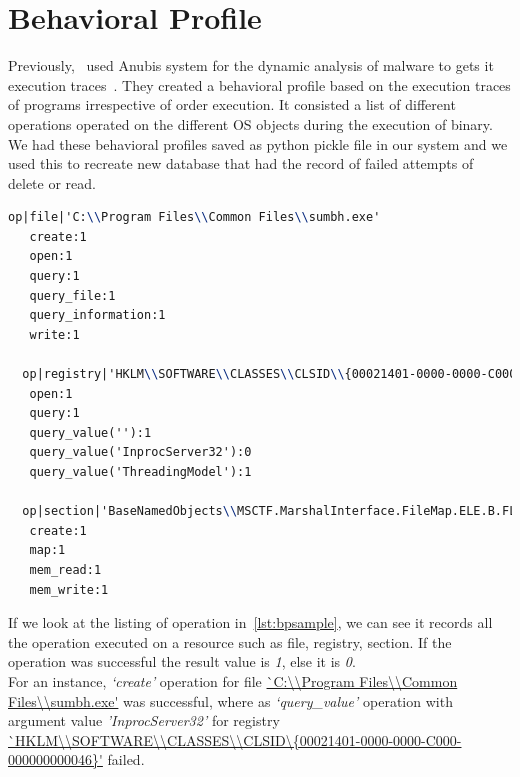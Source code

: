 \section{Behavioral Profile}
\label{sec:behvairoalprofile}
Previously,~\citeauthor{bayer} used Anubis system for the dynamic analysis of malware to gets it execution traces~\cite[]{bayer}.
They created a behavioral profile based on the execution traces of programs irrespective of order execution. It consisted a list of different operations operated on the different OS objects during the execution of binary.
We had these behavioral profiles saved as python pickle file in our system and we used this to recreate new database that had the record of failed attempts of delete or read.\\
\begin{lstlisting}[basicstyle=\tiny,language=TeX,caption={Behvaioral Profile sample}, label={lst:bpsample}]
  op|file|'C:\\Program Files\\Common Files\\sumbh.exe'
   create:1
   open:1
   query:1
   query_file:1
   query_information:1
   write:1

  op|registry|'HKLM\\SOFTWARE\\CLASSES\\CLSID\\{00021401-0000-0000-C000-000000000046}'
   open:1
   query:1
   query_value(''):1
   query_value('InprocServer32'):0
   query_value('ThreadingModel'):1

  op|section|'BaseNamedObjects\\MSCTF.MarshalInterface.FileMap.ELE.B.FLKMG'
   create:1
   map:1
   mem_read:1
   mem_write:1
\end{lstlisting}
If we look at the listing of operation in~\autoref{lst:bpsample}, we can see it records all the operation executed on a resource such as file, registry, section. If the operation was successful the result value is \emph{1}, else it is \emph{0}.\\
For an instance, \textit{`create'} operation for file \url{`C:\\Program Files\\Common Files\\sumbh.exe'} was successful, where as \textit{`query\_value'} operation with argument value \emph{'InprocServer32'} for registry \url{`HKLM\\SOFTWARE\\CLASSES\\CLSID\\{00021401-0000-0000-C000-000000000046}'} failed. %
